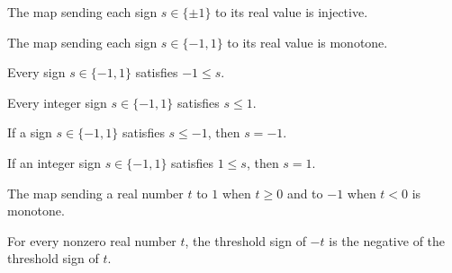 \begin{theorem}
\label{FABL.signValue_injective}
\leanok
{}
The map sending each sign $s\in\{\pm1\}$ to its real value is injective.
\end{theorem}

\begin{theorem}
\label{FABL.monotone_signValue}
\leanok
{}
The map sending each sign $s\in\{-1,1\}$ to its real value is monotone.
\end{theorem}

\begin{theorem}
\label{FABL.neg_one_le_sign}
\leanok
{}
Every sign $s\in\{-1,1\}$ satisfies $-1\le s$.
\end{theorem}

\begin{theorem}
\label{FABL.sign_le_one}
\leanok
{}
Every integer sign $s\in\{-1,1\}$ satisfies $s\le 1$.
\end{theorem}

\begin{theorem}
\label{FABL.sign_eq_neg_one_of_le_neg_one}
\leanok
{}
If a sign $s\in\{-1,1\}$ satisfies $s\le -1$, then $s=-1$.
\end{theorem}

\begin{theorem}
\label{FABL.sign_eq_one_of_one_le}
\leanok
{}
If an integer sign $s\in\{-1,1\}$ satisfies $1\le s$, then $s=1$.
\end{theorem}

\begin{theorem}
\label{FABL.monotone_thresholdSign}
\leanok
{}
The map sending a real number $t$ to $1$ when $t\geq0$ and to $-1$ when $t<0$ is
monotone.
\end{theorem}

\begin{theorem}
\label{FABL.thresholdSign_neg}
\leanok
{}
For every nonzero real number $t$, the threshold sign of $-t$ is the negative of the
threshold sign of $t$.
\end{theorem}

